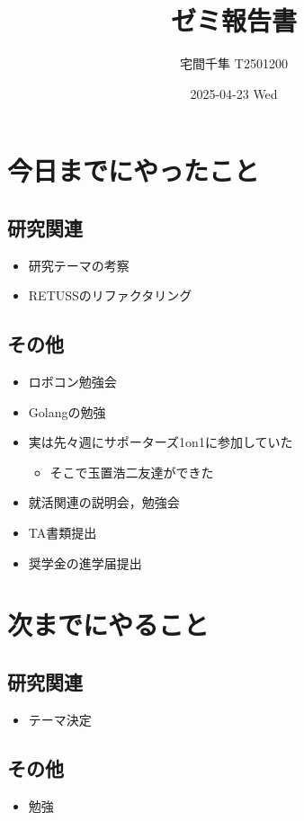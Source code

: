 \documentclass[uplatex, onecolumn, 10pt]{jsarticle}
\begin{document}
\title{\vspace{-40mm}\bf{\LARGE{ゼミ報告書}}}
\author{\vspace{-40mm}宅間千隼 T2501200}
\date{2025-04-23 Wed}
\maketitle


\section{今日までにやったこと}

\subsection*{研究関連}
\begin{itemize}
  \item 研究テーマの考察
  \item RETUSSのリファクタリング
\end{itemize}

\subsection*{その他}
\begin{itemize}
  \item ロボコン勉強会
  \item Golangの勉強
  \item 実は先々週にサポーターズ1on1に参加していた
  \begin{itemize}
    \item そこで玉置浩二友達ができた
  \end{itemize}
  \item 就活関連の説明会，勉強会
  \item TA書類提出
  \item 奨学金の進学届提出
\end{itemize}

\section{次までにやること}

\subsection*{研究関連}
\begin{itemize}
  \item テーマ決定
\end{itemize}

\subsection*{その他}
\begin{itemize}
  \item 勉強
\end{itemize}
\end{document}

